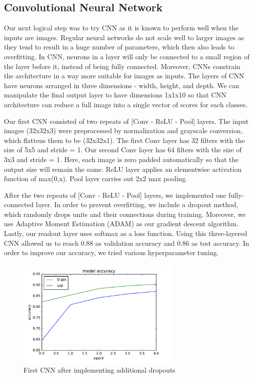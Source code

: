 \documentclass[12pt]{article}
\begin{document}
\subsection{Convolutional Neural Network}
\indent \indent Our next logical step was to try CNN as it is known to perform well when the inputs are images. Regular neural networks do not scale well to larger images as they tend to result in a huge number of parameters, which then also leads to overfitting. In CNN, neurons in a layer will only be connected to a small region of the layer before it, instead of being fully connected.  Moreover, CNNs constrain the architecture in a way more suitable for images as inputs. The layers of CNN have neurons arranged in three dimensions - width, height, and depth. We can manipulate the final output layer to have dimensions 1x1x10 so that CNN architecture can reduce a full image into a single vector of scores for each classes. 


\indent Our first CNN consisted of two repeats of [Conv - ReLU - Pool] layers. The input images (32x32x3) were preprocessed by normalization and grayscale conversion, which flattens them to be (32x32x1). The first Conv layer has 32 filters with the size of 5x5 and stride = 1. Our second Conv layer has 64 filters with the size of 3x3 and stride = 1. Here, each image is zero padded automatically so that the output size will remain the same. ReLU layer applies an elementwise activation function of max(0,x). Pool layer carries out 2x2 max pooling. 

\indent After the two repeats of [Conv - ReLU - Pool] layers, we implemented one fully-connected layer. In order to prevent overfitting, we include a dropout method, which randomly drops units and their connections during training. Moreover, we use Adaptive Moment Estimation (ADAM) as our gradient descent algorithm. Lastly, our readout layer uses softmax as a loss function. Using this three-layered CNN allowed us to reach 0.88 as validation accuracy and 0.86 as test accuracy. In order to improve our accuracy, we tried various hyperparameter tuning. 

\begin{figure}[!tpb]
	\centerline{\includegraphics[width=80mm]{Accuracy_conv32_5x5_conv64_5x5_fc1024_all_dropout0_25.pdf}}
	\caption{\label{Figure 2}
		First CNN after implementing additional dropouts}
\end{figure}
\end{document}
